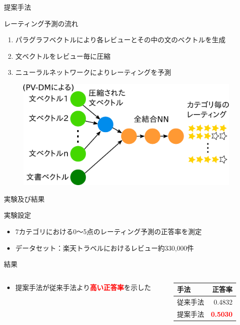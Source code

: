 \documentclass[aspectratio=43,unicode,10pt]{beamer}
\newcommand{\fire}[1]{\textcolor{red}{\textbf{#1}}}
\begin{document}
\begin{frame}{提案手法}{}
  \begin{block}{レーティング予測の流れ}
    \begin{enumerate}
      \item パラグラフベクトルにより各レビューとその中の文のベクトルを生成
      \item 文ベクトルをレビュー毎に圧縮
      \item ニューラルネットワークによりレーティングを予測
    \end{enumerate}
    \begin{figure}
      \includegraphics[width=0.5\linewidth]{fig/model.png}
    \end{figure}
  \end{block}
\end{frame}

\begin{frame}{実験及び結果}{}
  \begin{block}{実験設定}
    \begin{itemize}
      \item 7カテゴリにおける0〜5点のレーティング予測の正答率を測定
      \item データセット：楽天トラベルにおけるレビュー約330,000件
    \end{itemize}
  \end{block}
  \begin{block}{結果}
    \begin{columns}[onlytextwidth,t]
      \begin{column}{0.6\linewidth}
        \begin{itemize}
          \item 提案手法が従来手法より\fire{高い正答率}を示した
        \end{itemize}
      \end{column}
      \begin{column}{0.4\linewidth}
        \begin{table}
          \centering
          \begin{tabular}{l | r} \label{tab:Accuracies}
            手法 & 正答率 \\
            \hline
            従来手法 & 0.4832 \\
            提案手法 & \fire{0.5030} \\
          \end{tabular}
        \end{table}
      \end{column}
    \end{columns}
  \end{block}
\end{frame}
\end{document}
